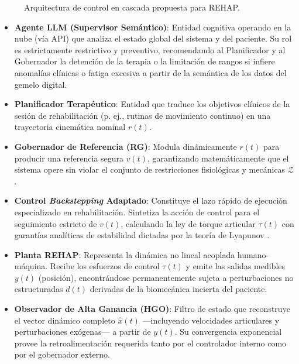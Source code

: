 \documentclass[a4paper,12pt]{article}
\begin{document}
\begin{figure}[H]
    \caption{Arquitectura de control en cascada propuesta para REHAP.}
    \label{fig:arch}
\end{figure}

\begin{itemize}
    \item \textbf{Agente LLM (Supervisor Semántico)}: Entidad cognitiva operando en la nube (vía API) que analiza el estado global del sistema y del paciente. Su rol es estrictamente restrictivo y preventivo, recomendando al Planificador y al Gobernador la detención de la terapia o la limitación de rangos si infiere anomalías clínicas o fatiga excesiva a partir de la semántica de los datos del gemelo digital.
    \item \textbf{Planificador Terapéutico}: Entidad que traduce los objetivos clínicos de la sesión de rehabilitación (p. ej., rutinas de movimiento continuo) en una trayectoria cinemática nominal $r(t)$.
    \item \textbf{Gobernador de Referencia (RG)}: Modula dinámicamente $r(t)$ para producir una referencia segura $v(t)$, garantizando matemáticamente que el sistema opere sin violar el conjunto de restricciones fisiológicas y mecánicas $\mathcal{Z}$ \citep{garone2017reference}.
    \item \textbf{Control \textit{Backstepping} Adaptado}: Constituye el lazo rápido de ejecución especializado en rehabilitación. Sintetiza la acción de control para el seguimiento estricto de $v(t)$, calculando la ley de torque articular $\tau(t)$ con garantías analíticas de estabilidad dictadas por la teoría de Lyapunov \citep{slotine1991applied}.
    \item \textbf{Planta REHAP}: Representa la dinámica no lineal acoplada humano-máquina. Recibe los esfuerzos de control $\tau(t)$ y emite las salidas medibles $y(t)$ (posición), encontrándose permanentemente sujeta a perturbaciones no estructuradas $d(t)$ derivadas de la biomecánica incierta del paciente.
    \item \textbf{Observador de Alta Ganancia (HGO)}: Filtro de estado que reconstruye el vector dinámico completo $\hat{x}(t)$ —incluyendo velocidades articulares y perturbaciones exógenas— a partir de $y(t)$. Su convergencia exponencial provee la retroalimentación requerida tanto por el controlador interno como por el gobernador externo.
\end{itemize}
\end{document}
